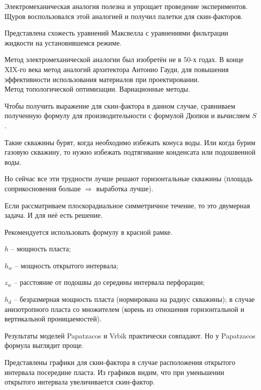 \documentclass[main.tex]{subfiles}
\begin{document}
Электромеханическая аналогия полезна и упрощает проведение экспериментов. Щуров воспользовался этой аналогией и получил палетки для скин-факторов.


Представлена схожесть уравнений Максвелла с уравнениями фильтрации жидкости на установившемся режиме.


Метод электромеханической аналогии был изобретён не в 50-х годах. В конце XIX-го века метод аналогий архитектора Антонио Гауди, для повышения эффективности использования материалов при проектировании.\\

Метод топологической оптимизации. Вариационные методы.


Чтобы получить выражение для скин-фактора в данном случае, сравниваем полученную формулу для производительности с формулой Дюпюи и вычисляем $S$.

Такие скважины бурят, когда необходимо избежать конуса воды. Или когда бурим газовую скважину, то нужно избежать подтягивание конденсата или подошвенной воды.

Но сейчас все эти трудности лучше решают горизонтальные скважины (площадь соприкосновения больше $\Rightarrow$ выработка лучше).


Если рассматриваем плоскорадиальное симметричное течение, то это двумерная задача. И для неё есть решение.

Рекомендуется использовать формулу в красной рамке.

$h$ -- мощность пласта;

$h_w$ -- мощность открытого интервала;

$z_w$ -- расстояние от подошвы до середины интервала перфорации;

$h_d$ -- безразмерная мощность пласта (нормирована на радиус скважины); в случае анизотропного пласта со множителем (корень из отношения горизонтальной и вертикальной проницаемостей).


Результаты моделей Papatzacos и Vrbik практически совпадают. Но у Papatzacos формула выглядит проще.

Представлены графики для скин-фактора в случае расположения открытого интервала посередине пласта. Из графиков видим, что при уменьшении открытого интервала увеличивается скин-фактор.
\end{document}
